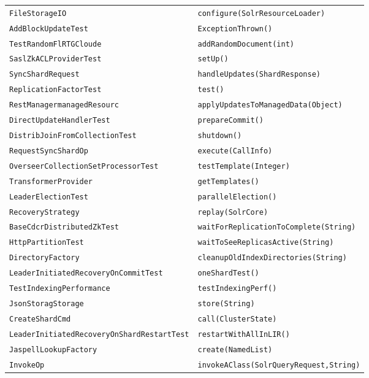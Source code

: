 \begin{center}
\begin{longtable}{ll}
\lstinline/FileStorageIO/&{\lstinline/configure(SolrResourceLoader)/}\\
\lstinline/AddBlockUpdateTest/&{\lstinline/ExceptionThrown()/}\\
\lstinline/TestRandomFlRTGCloude/&{\lstinline/addRandomDocument(int)/}\\
\lstinline/SaslZkACLProviderTest/&{\lstinline/setUp()/}\\
\lstinline/SyncShardRequest/&{\lstinline/handleUpdates(ShardResponse)/}\\
\lstinline/ReplicationFactorTest/&{\lstinline/test()/}\\
\lstinline/RestManagermanagedResourc/&{\lstinline/applyUpdatesToManagedData(Object)/}\\
\lstinline/DirectUpdateHandlerTest/&{\lstinline/prepareCommit()/}\\
\lstinline/DistribJoinFromCollectionTest/&{\lstinline/shutdown()/}\\
\lstinline/RequestSyncShardOp/&{\lstinline/execute(CallInfo)/}\\
\lstinline/OverseerCollectionSetProcessorTest/&{\lstinline/testTemplate(Integer)/}\\
\lstinline/TransformerProvider/&{\lstinline/getTemplates()/}\\
\lstinline/LeaderElectionTest/&{\lstinline/parallelElection()/}\\
\lstinline/RecoveryStrategy/&{\lstinline/replay(SolrCore)/}\\
\lstinline/BaseCdcrDistributedZkTest/&{\lstinline/waitForReplicationToComplete(String)/}\\
\lstinline/HttpPartitionTest/&{\lstinline/waitToSeeReplicasActive(String)/}\\
\lstinline/DirectoryFactory/&{\lstinline/cleanupOldIndexDirectories(String)/}\\
\lstinline/LeaderInitiatedRecoveryOnCommitTest/&{\lstinline/oneShardTest()/}\\
\lstinline/TestIndexingPerformance/&{\lstinline/testIndexingPerf()/}\\
\lstinline/JsonStoragStorage/&{\lstinline/store(String)/}\\
\lstinline/CreateShardCmd/&{\lstinline/call(ClusterState)/}\\
\lstinline/LeaderInitiatedRecoveryOnShardRestartTest/&{\lstinline/restartWithAllInLIR()/}\\
\lstinline/JaspellLookupFactory/&{\lstinline/create(NamedList)/}\\
\lstinline/InvokeOp/&{\lstinline/invokeAClass(SolrQueryRequest,String)/}\\

\end{longtable}
\end{center}

